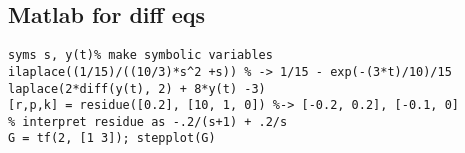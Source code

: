 \documentclass{article}
\begin{document}
\begin{multicols*}{2}
\begin{itemize}
\section{Matlab for diff eqs}
\begin{lstlisting}
syms s, y(t)% make symbolic variables
ilaplace((1/15)/((10/3)*s^2 +s)) % -> 1/15 - exp(-(3*t)/10)/15
laplace(2*diff(y(t), 2) + 8*y(t) -3)
[r,p,k] = residue([0.2], [10, 1, 0]) %-> [-0.2, 0.2], [-0.1, 0] 
% interpret residue as -.2/(s+1) + .2/s
G = tf(2, [1 3]); stepplot(G)


\end{lstlisting}



\end{itemize}
\end{multicols*}
\end{document}
